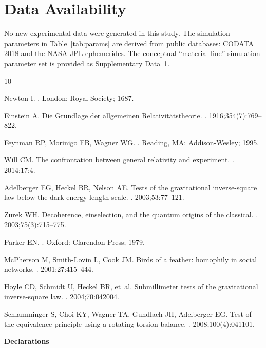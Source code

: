 \documentclass[12pt,a4paper]{article}
\begin{document}
\section*{Data Availability}

No new experimental data were generated in this study. The simulation parameters in Table~\ref{tab:params} are derived from public databases: CODATA 2018 and the NASA JPL ephemerides. The conceptual ``material-line'' simulation parameter set is provided as Supplementary Data~1.



\begin{thebibliography}{10}

Newton I.
.
\newblock London: Royal Society; 1687.

Einstein A.
\newblock Die Grundlage der allgemeinen Relativit\"{a}tstheorie.
. 1916;354(7):769--822.

Feynman RP, Morinigo FB, Wagner WG.
.
\newblock Reading, MA: Addison-Wesley; 1995.

Will CM.
\newblock The confrontation between general relativity and experiment.
. 2014;17:4.

Adelberger EG, Heckel BR, Nelson AE.
\newblock Tests of the gravitational inverse-square law below the dark-energy length scale.
. 2003;53:77--121.

Zurek WH.
\newblock Decoherence, einselection, and the quantum origins of the classical.
. 2003;75(3):715--775.

Parker EN.
.
\newblock Oxford: Clarendon Press; 1979.

McPherson M, Smith-Lovin L, Cook JM.
\newblock Birds of a feather: homophily in social networks.
. 2001;27:415--444.

Hoyle CD, Schmidt U, Heckel BR, et~al.
\newblock Submillimeter tests of the gravitational inverse-square law.
. 2004;70:042004.

Schlamminger S, Choi KY, Wagner TA, Gundlach JH, Adelberger EG.
\newblock Test of the equivalence principle using a rotating torsion balance.
. 2008;100(4):041101.

\end{thebibliography}
\textbf{\textbf{Declarations}}
\end{document}
